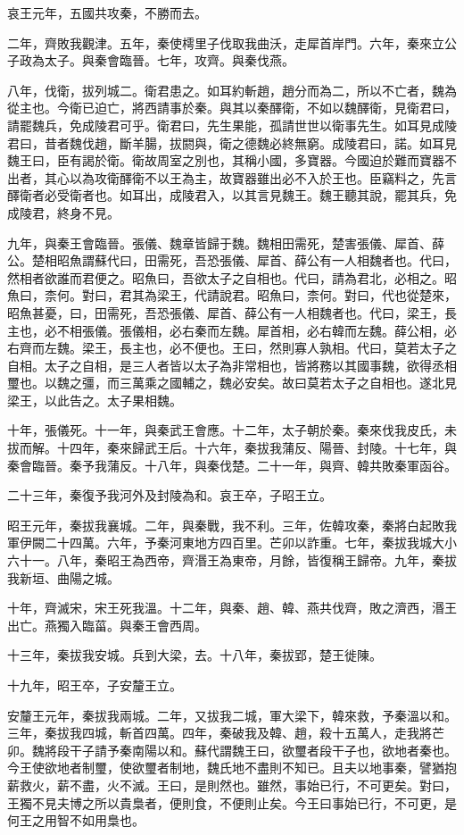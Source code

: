 哀王元年，五國共攻秦，不勝而去。

二年，齊敗我觀津。五年，秦使樗里子伐取我曲沃，走犀首岸門。六年，秦來立公子政為太子。與秦會臨晉。七年，攻齊。與秦伐燕。

八年，伐衛，拔列城二。衛君患之。如耳約斬趙，趙分而為二，所以不亡者，魏為從主也。今衛已迫亡，將西請事於秦。與其以秦醳衛，不如以魏醳衛，見衛君曰，請罷魏兵，免成陵君可乎。衛君曰，先生果能，孤請世世以衛事先生。如耳見成陵君曰，昔者魏伐趙，斷羊腸，拔閼與，衛之德魏必終無窮。成陵君曰，諾。如耳見魏王曰，臣有謁於衛。衛故周室之別也，其稱小國，多寶器。今國迫於難而寶器不出者，其心以為攻衛醳衛不以王為主，故寶器雖出必不入於王也。臣竊料之，先言醳衛者必受衛者也。如耳出，成陵君入，以其言見魏王。魏王聽其說，罷其兵，免成陵君，終身不見。

九年，與秦王會臨晉。張儀、魏章皆歸于魏。魏相田需死，楚害張儀、犀首、薛公。楚相昭魚謂蘇代曰，田需死，吾恐張儀、犀首、薛公有一人相魏者也。代曰，然相者欲誰而君便之。昭魚曰，吾欲太子之自相也。代曰，請為君北，必相之。昭魚曰，柰何。對曰，君其為梁王，代請說君。昭魚曰，柰何。對曰，代也從楚來，昭魚甚憂，曰，田需死，吾恐張儀、犀首、薛公有一人相魏者也。代曰，梁王，長主也，必不相張儀。張儀相，必右秦而左魏。犀首相，必右韓而左魏。薛公相，必右齊而左魏。梁王，長主也，必不便也。王曰，然則寡人孰相。代曰，莫若太子之自相。太子之自相，是三人者皆以太子為非常相也，皆將務以其國事魏，欲得丞相璽也。以魏之彊，而三萬乘之國輔之，魏必安矣。故曰莫若太子之自相也。遂北見梁王，以此告之。太子果相魏。

十年，張儀死。十一年，與秦武王會應。十二年，太子朝於秦。秦來伐我皮氏，未拔而解。十四年，秦來歸武王后。十六年，秦拔我蒲反、陽晉、封陵。十七年，與秦會臨晉。秦予我蒲反。十八年，與秦伐楚。二十一年，與齊、韓共敗秦軍函谷。

二十三年，秦復予我河外及封陵為和。哀王卒，子昭王立。

昭王元年，秦拔我襄城。二年，與秦戰，我不利。三年，佐韓攻秦，秦將白起敗我軍伊闕二十四萬。六年，予秦河東地方四百里。芒卯以詐重。七年，秦拔我城大小六十一。八年，秦昭王為西帝，齊湣王為東帝，月餘，皆復稱王歸帝。九年，秦拔我新垣、曲陽之城。

十年，齊滅宋，宋王死我溫。十二年，與秦、趙、韓、燕共伐齊，敗之濟西，湣王出亡。燕獨入臨菑。與秦王會西周。

十三年，秦拔我安城。兵到大梁，去。十八年，秦拔郢，楚王徙陳。

十九年，昭王卒，子安釐王立。

安釐王元年，秦拔我兩城。二年，又拔我二城，軍大梁下，韓來救，予秦溫以和。三年，秦拔我四城，斬首四萬。四年，秦破我及韓、趙，殺十五萬人，走我將芒卯。魏將段干子請予秦南陽以和。蘇代謂魏王曰，欲璽者段干子也，欲地者秦也。今王使欲地者制璽，使欲璽者制地，魏氏地不盡則不知已。且夫以地事秦，譬猶抱薪救火，薪不盡，火不滅。王曰，是則然也。雖然，事始已行，不可更矣。對曰，王獨不見夫博之所以貴梟者，便則食，不便則止矣。今王曰事始已行，不可更，是何王之用智不如用梟也。

